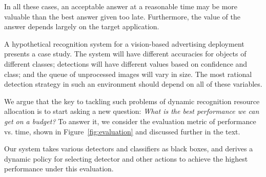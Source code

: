 In all these cases, an acceptable answer at a reasonable time may be more valuable than the best answer given too late.
Furthermore, the value of the answer depends largely on the target application.

A hypothetical recognition system for a vision-based advertising deployment presents a case study.
The system will have different accuracies for objects of different classes; detections will have different values based on confidence and class; and the queue of unprocessed images will vary in size.
The most rational detection strategy in such an environment should depend on all of these variables.

We argue that the key to tackling such problems of dynamic recognition resource allocation is to start asking a new question:
\emph{What is the best performance we can get on a budget?}
To answer it, we consider the evaluation metric of performance vs. time, shown in Figure~\ref{fig:evaluation} and discussed further in the text.

Our system takes various detectors and classifiers as black boxes, and derives a dynamic policy for selecting detector and other actions to achieve the highest performance under this evaluation.
